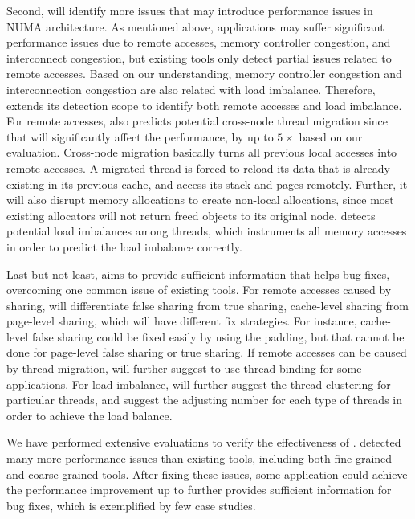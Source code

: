 Second, \NP{} will identify more issues that may introduce performance issues in NUMA architecture. As mentioned above, applications may suffer significant performance issues due to remote accesses, memory controller congestion, and interconnect congestion, but existing tools only detect partial issues related to remote accesses. Based on our understanding, memory controller congestion and interconnection congestion are also related with load imbalance. Therefore, \NP{} extends its detection scope to identify both remote accesses and load imbalance. For remote accesses, \NP{} also predicts potential cross-node thread migration since that will significantly affect the performance, by up to $5\times$ based on our evaluation. Cross-node migration basically turns all previous local accesses into remote accesses. A migrated thread is forced to reload its data that is already existing in its previous cache, and access its stack and pages remotely. Further, it will also disrupt memory allocations to create non-local allocations, since most existing allocators will not return freed objects to its original node. \NP{} detects potential load imbalances among threads, which instruments all memory accesses in order to predict the load imbalance correctly. 

Last but not least, \NP{} aims to provide sufficient information that helps bug fixes, overcoming one common issue of existing tools. For remote accesses caused by sharing, \NP{} will differentiate false sharing from true sharing, cache-level sharing from page-level sharing, which will have different fix strategies. For instance, cache-level false sharing could be fixed easily by using the padding, but that cannot be done for page-level false sharing or true sharing. If remote accesses can be caused by thread migration, \NP{} will further suggest to use thread binding for some applications. For load imbalance, \NP{} will further suggest the thread clustering for particular threads, and suggest the adjusting number for each type of threads in order to achieve the load balance.   



We have performed extensive evaluations to verify the effectiveness of \NP{}. \NP{} detected many more performance issues than existing tools, including both fine-grained and coarse-grained tools. After fixing these issues, some application could achieve the performance improvement up to %
\NP{} further provides sufficient information for bug fixes, which is exemplified by few case studies. 

